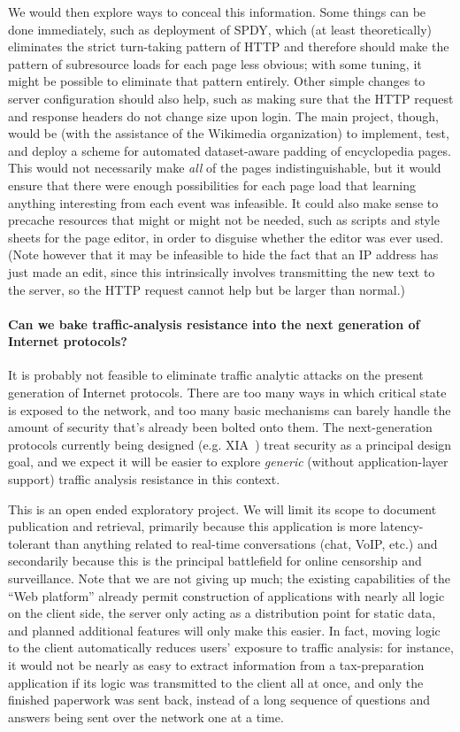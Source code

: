 \documentclass[oneside]{zarticle}
\begin{document}
\begin{multicols}{2}
We would then explore ways to conceal this information.  Some things
can be done immediately, such as deployment of SPDY, which (at least
theoretically) eliminates the strict turn-taking pattern of HTTP and
therefore should make the pattern of subresource loads for each page
less obvious; with some tuning, it might be possible to eliminate that
pattern entirely.  Other simple changes to server configuration should
also help, such as making sure that the HTTP request and response
headers do not change size upon login.  The main project, though,
would be (with the assistance of the Wikimedia organization) to
implement, test, and deploy a scheme for automated dataset-aware
padding of encyclopedia pages.  This would not necessarily make
\emph{all} of the pages indistinguishable, but it would ensure that
there were enough possibilities for each page load that learning
anything interesting from each event was infeasible.  It could also
make sense to precache resources that might or might not be needed,
such as scripts and style sheets for the page editor, in order to
disguise whether the editor was ever used.  (Note however that it may
be infeasible to hide the fact that an IP address has just made an
edit, since this intrinsically involves transmitting the new text to
the server, so the HTTP request cannot help but be larger than
normal.)

\paragraph{Can we bake traffic-analysis resistance into the next
generation of Internet protocols?}  It is probably not feasible to
eliminate traffic analytic attacks on the present generation of
Internet protocols.  There are too many ways in which critical state
is exposed to the network, and too many basic mechanisms can barely
handle the amount of security that's already been bolted onto them.
The next-generation protocols currently being designed
(e.g. XIA~\cite{xia2013xia}) treat security as a principal design
goal, and we expect it will be easier to explore \emph{generic}
(without application-layer support) traffic analysis resistance in
this context.

This is an open ended exploratory project.  We will limit its scope to
document publication and retrieval, primarily because this application
is more latency-tolerant than anything related to real-time
conversations (chat, VoIP, etc.) and secondarily because this is the
principal battlefield for online censorship and surveillance.  Note
that we are not giving up much; the existing capabilities of the “Web
platform” already permit construction of applications with nearly all
logic on the client side, the server only acting as a distribution
point for static data, and planned additional features will only make
this easier.  In fact, moving logic to the client automatically
reduces users' exposure to traffic analysis: for instance, it would
not be nearly as easy to extract information from a tax-preparation
application if its logic was transmitted to the client all at once,
and only the finished paperwork was sent back, instead of a long
sequence of questions and answers being sent over the network one at a
time.


\end{multicols}
\end{document}
